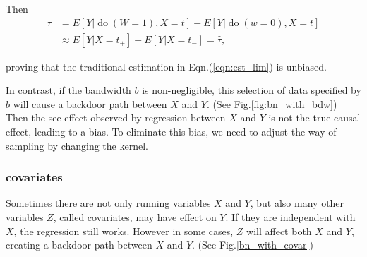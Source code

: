 \documentclass[a4 paper,12pt]{article}
\DeclareMathOperator{\Do}{do}
\begin{document}
Then
\begin{align}
   \tau&=E[Y|\Do(W=1),X=t]-E[Y|\Do(w=0),X=t]\\
   &\approx E[Y|X=t_+]-E[Y|X=t_-]=\hat\tau,
\end{align}

\noindent proving that the traditional estimation in Eqn.(\ref{eqn:est_lim}) is unbiased.

In contrast, if the bandwidth $b$ is non-negligible, this selection of data specified by $b$ will cause a backdoor path between $X$ and $Y$. (See Fig.\ref{fig:bn_with_bdw}) Then the see effect observed by regression between $X$ and $Y$ is not the true causal effect, leading to a bias. To eliminate this bias, we need to adjust the way of sampling by changing the kernel.

\subsubsection*{covariates}
Sometimes there are not only running variables $X$ and $Y$, but also many other variables $Z$, called covariates, may have effect on $Y$. If they are independent with $X$, the regression still works. However in some cases, $Z$ will affect both $X$ and $Y$, creating a backdoor path between $X$ and $Y$. (See Fig.\ref{bn_with_covar})
\end{document}
